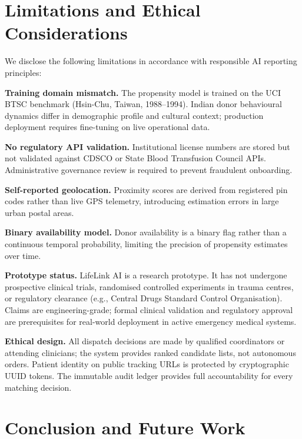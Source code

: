 \documentclass[conference]{IEEEtran}
\begin{document}
\section{Limitations and Ethical Considerations}

We disclose the following limitations in accordance with responsible
AI reporting principles:

\textbf{Training domain mismatch.} The propensity model is trained on
the UCI BTSC benchmark (Hsin-Chu, Taiwan, 1988--1994). Indian donor
behavioural dynamics differ in demographic profile and cultural context;
production deployment requires fine-tuning on live operational data.

\textbf{No regulatory API validation.} Institutional license numbers
are stored but not validated against CDSCO or State Blood Transfusion
Council APIs. Administrative governance review is required to prevent
fraudulent onboarding.

\textbf{Self-reported geolocation.} Proximity scores are derived from
registered pin codes rather than live GPS telemetry, introducing
estimation errors in large urban postal areas.

\textbf{Binary availability model.} Donor availability is a binary
flag rather than a continuous temporal probability, limiting the
precision of propensity estimates over time.

\textbf{Prototype status.} LifeLink AI is a research prototype. It has
not undergone prospective clinical trials, randomised controlled
experiments in trauma centres, or regulatory clearance (e.g., Central
Drugs Standard Control Organisation). Claims are engineering-grade;
formal clinical validation and regulatory approval are prerequisites
for real-world deployment in active emergency medical systems.

\textbf{Ethical design.} All dispatch decisions are made by qualified
coordinators or attending clinicians; the system provides ranked
candidate lists, not autonomous orders. Patient identity on public
tracking URLs is protected by cryptographic UUID tokens. The immutable
audit ledger provides full accountability for every matching decision.

\section{Conclusion and Future Work}
\end{document}
